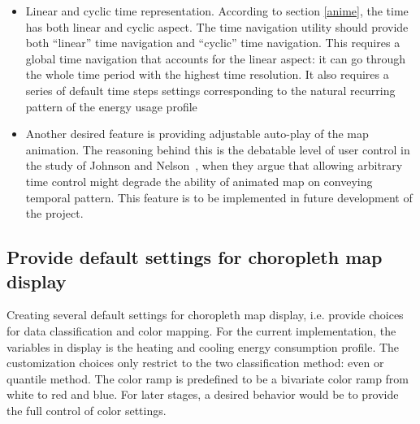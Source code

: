 \begin{itemize}

\item Linear and cyclic time representation. According to section
  \ref{anime}, the time has both linear and cyclic aspect. The time
  navigation utility should provide both ``linear'' time navigation
  and ``cyclic'' time navigation. This requires a global time
  navigation that accounts for the linear aspect: it can go through
  the whole time period with the highest time resolution. It also
  requires a series of default time steps settings corresponding to
  the natural recurring pattern of the energy usage profile
\item Another desired feature is providing adjustable auto-play of the
  map animation. The reasoning behind this is the debatable level of
  user control in the study of Johnson and Nelson~\cite{Nelson1998},
  when they argue that allowing arbitrary time control might degrade
  the ability of animated map on conveying temporal pattern. This
  feature is to be implemented in future development of the project.
\end{itemize}

\subsection{Provide default settings for choropleth map display}
Creating several default settings for choropleth map display,
i.e. provide choices for data classification and color mapping. For
the current implementation, the variables in display is the heating
and cooling energy consumption profile. The customization choices only
restrict to the two classification method: even or quantile
method. The color ramp is predefined to be a bivariate color ramp from
white to red and blue. For later stages, a desired behavior would be
to provide the full control of color settings.